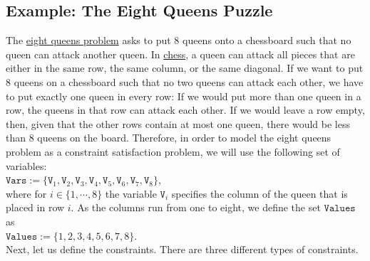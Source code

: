 \subsection{Example: The Eight Queens Puzzle}
The \href{https://en.wikipedia.org/wiki/Eight_queens_puzzle}{eight queens problem} asks to put 8 queens onto a
chessboard such that no queen can attack another queen.  In \href{https://en.wikipedia.org/wiki/Chess}{chess},
a queen can attack all pieces that are either in the same row, the same column, or the same diagonal.  If we
want to put 8 queens on a chessboard such that no two queens can attack each other, we have to put exactly one
queen in every row:  If we would put more than one queen in a row, the queens in that row can attack each other.
If we would leave a row empty, then, given that the other rows contain at most one queen, there would be less
than 8 queens on the board.  Therefore, in order to model the eight queens problem as a constraint satisfaction
problem, we will use the following set of variables:
\\[0.2cm]
\hspace*{1.3cm}
$\texttt{Vars} := \{ \texttt{V}_1, \texttt{V}_2, \texttt{V}_3, \texttt{V}_4, \texttt{V}_5, \texttt{V}_6, \texttt{V}_7,\texttt{V}_8 \}$,
\\[0.2cm]
where for $i \in \{1,\cdots,8\}$ the variable $\texttt{V}_i$ specifies the column of the queen that is placed in
row $i$.   As the columns run from one to eight, we define the set $\texttt{Values}$ as
\\[0.2cm]
\hspace*{1.3cm}
$\texttt{Values} := \{1,2,3,4,5,6,7,8\}$.
\\[0.2cm]
Next, let us define the constraints.  There are three different types of constraints.
